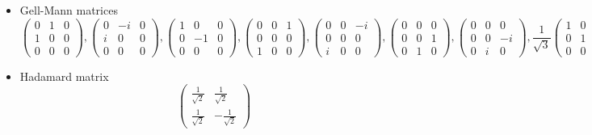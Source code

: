 \documentclass{elsart}
\newcommand{\1}{{\rm 1\hspace{-0.9mm}l}}
\begin{document}
\begin{itemize}
\item Gell-Mann matrices
\begin{equation}
\left(
\begin{smallmatrix}
 0 & 1 & 0 \\
 1 & 0 & 0 \\
 0 & 0 & 0
\end{smallmatrix}
\right),\left(
\begin{smallmatrix}
 0 & -i & 0 \\
 i & 0 & 0 \\
 0 & 0 & 0
\end{smallmatrix}
\right),
\left(
\begin{smallmatrix}
 1 & 0 & 0 \\
 0 & -1 & 0 \\
 0 & 0 & 0
\end{smallmatrix}
\right),
\left(
\begin{smallmatrix}
 0 & 0 & 1 \\
 0 & 0 & 0 \\
 1 & 0 & 0
\end{smallmatrix}
\right),
\left(
\begin{smallmatrix}
 0 & 0 & -i \\
 0 & 0 & 0 \\
 i & 0 & 0
\end{smallmatrix}
\right),
\left(
\begin{smallmatrix}
 0 & 0 & 0 \\
 0 & 0 & 1 \\
 0 & 1 & 0
\end{smallmatrix}
\right),
\left(
\begin{smallmatrix}
 0 & 0 & 0 \\
 0 & 0 & -i \\
 0 & i & 0
\end{smallmatrix}
\right),
\frac{1}{\sqrt{3}}\left(
\begin{smallmatrix}
 1 & 0 & 0 \\
 0 & 1 & 0 \\
 0 & 0 & -2
\end{smallmatrix}
\right).
\end{equation}
\item Hadamard matrix 
\begin{equation}
\left(
\begin{smallmatrix}
 \frac{1}{\sqrt{2}} & \frac{1}{\sqrt{2}} \\
 \frac{1}{\sqrt{2}} & -\frac{1}{\sqrt{2}}
\end{smallmatrix}
\right)
\end{equation}
\end{itemize}
\end{document}
